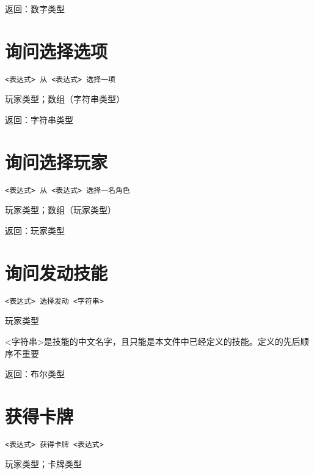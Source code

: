 返回：数字类型

\section{询问选择选项}

\begin{verbatim}
<表达式> 从 <表达式> 选择一项
\end{verbatim}

玩家类型；数组（字符串类型）

返回：字符串类型

\section{询问选择玩家}

\begin{verbatim}
<表达式> 从 <表达式> 选择一名角色
\end{verbatim}

玩家类型；数组（玩家类型）

返回：玩家类型

\section{询问发动技能}

\begin{verbatim}
<表达式> 选择发动 <字符串>
\end{verbatim}

玩家类型

<字符串>是技能的中文名字，且只能是本文件中已经定义的技能。定义的先后顺序不重要

返回：布尔类型

\section{获得卡牌}

\begin{verbatim}
<表达式> 获得卡牌 <表达式>
\end{verbatim}

玩家类型；卡牌类型

